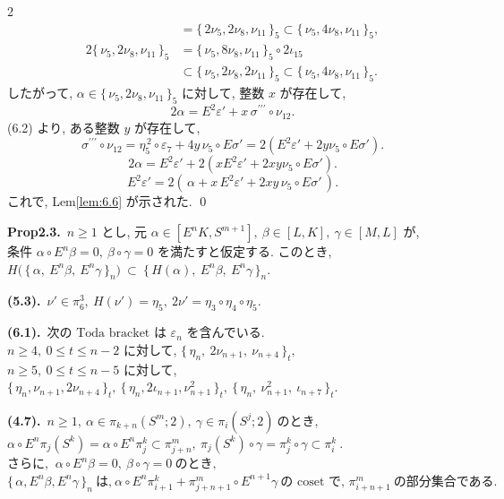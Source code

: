\documentclass[10pt, leqno]{ltjsarticle}
\newcommand{\todai}[2][]{\{\,#2\,\}_{#1}}      %
\newcommand{\pis}[2]{\pi_{#1}(#2)}       %
\newcommand{\pit}[2]{\pi_{#1}^{#2}}
\numberwithin{equation}{section}
\theoremstyle{plain}
\theoremstyle{definition}
\theoremstyle{remark}
\begin{document}
\begin{paracol}{2}
\[\begin{align*}
& = \todai[5]{2\nu_{5},2\nu_{8},\nu_{11}}
\subset \todai[5]{\nu_{5},4\nu_{8},\nu_{11}},\\
2\todai[5]{\nu_{5},2\nu_{8},\nu_{11}}
& = \todai[5]{\nu_{5},8\nu_{8},\nu_{11}}\circ 2\iota_{15}\\
& \subset \todai[5]{\nu_{5},2\nu_{8},2\nu_{11}}
\subset \todai[5]{\nu_{5},4\nu_{8},\nu_{11}}.
\end{align*}
\]
したがって, 
\(\alpha\in\todai[5]{\nu_{5},2\nu_{8},\nu_{11}}\) 
に対して, 整数 \(x\) が存在して,
\[
2\alpha
=E^{2}\varepsilon' + x\,\sigma^{\prime\prime\prime}\circ \nu_{12}.
\]
(6.2) より, ある整数 \(y\) が存在して, 
\[
\sigma^{\prime\prime\prime}\circ \nu_{12}
=\eta_{5}^{\,2}\circ \varepsilon_{7}+4y\,\nu_{5}\circ E\sigma' 
= 2(E^2 \varepsilon' + 2y\nu_5\circ E\sigma') .
\]
\[
2\alpha = 
E^2\varepsilon' + 
2(xE^2\varepsilon' + 2xy\nu_5\circ E\sigma').
\]
\begin{equation}\label{eq:6.6}
E^{2}\varepsilon'
=2(\,\alpha + x\,E^{2}\varepsilon' + 2xy\,\nu_{5}\circ E\sigma'\,).
\end{equation}
これで, Lem\ref{lem:6.6} が示された. 
\qed

\switchcolumn

\noindent
\textbf{Prop2.3.}\
$n\ge1$ とし, 元
\(
\alpha\in[E^nK, S^{m+1}],\
\beta\in[L, K],\
\gamma\in[M, L]
\)
が, \\
条件
\(
\alpha\circ E^n\beta=0,\ \beta\circ\gamma=0
\)
を満たすと仮定する. このとき,\\
\(
H\!\bigl(\,\{\,\alpha,\ E^n\beta,\ E^n\gamma\,\}_n\bigr)\ \subset\
\{\,H(\alpha),\ E^n\beta,\ E^n\gamma\,\}_n .
\)

\noindent
\textbf{(5.3).}\
\(\nu'\in\pi_6^3,\ H(\nu')=\eta_5,\ 2\nu'=\eta_3\circ\eta_4\circ\eta_5 .\)

\noindent
\textbf{(6.1).}\ 
\(\text{次の Toda bracket は } \varepsilon_n \text{ を含んでいる. }\quad\)\\
\(n\ge4,\ 0\le t\le n-2\) に対して, 
\(
\todai[t]{\eta_n,\ 2\nu_{n+1},\ \nu_{n+4}},
\)\\
\(n\ge5,\ 0\le t\le n-5\) に対して, \\
\(
\todai[t]{\eta_n, \nu_{n+1}, 2\nu_{n+4}},\
\todai[t]{\eta_n, 2\iota_{n+1}, \nu_{n+1}^2},\
\todai[t]{\eta_n,\ \nu_{n+1}^{2},\ \iota_{n+7}} .
\)

\noindent
\textbf{(4.7).}\
\(n\ge1, \ \alpha\in\pis{k+n}{S^m; 2},\ \gamma\in\pis{i}{S^j; 2}
    \ \text{のとき, }\)\\
\(\alpha\circ E^n\pis{j}{S^k} = \alpha\circ E^n \pit{j}{k}
  \subset \pit{j+n}{m},
  \ \pis{j}{S^k}\circ\gamma = \pit{j}{k}\circ\gamma \subset\pit{i}{k}\ . \)\\
\(\text{さらに, }\ \alpha\circ E^n\beta=0,\ \beta\circ\gamma = 0 \ \text{のとき, }\)\\
\(\todai[n]{\alpha, E^n\beta, E^n\gamma}\ \text{は,}\
  \alpha\circ E^n\pit{i+1}{k} + \pit{j+n+1}{m}\circ E^{n+1}\gamma\
  \text{の coset で, }\pit{i+n+1}{m} \ \text{の部分集合である. }\)


\end{paracol}
\end{document}
